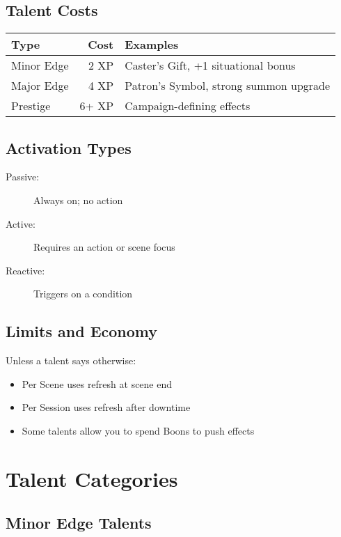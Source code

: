\documentclass[11pt,twoside,openany]{book}
\begin{document}
\subsection*{Talent Costs}

\begin{center}
\begin{tabular}{|l|r|l|}
\hline
\textbf{Type} & \textbf{Cost} & \textbf{Examples} \\
\hline
Minor Edge & 2 XP & Caster's Gift, +1 situational bonus \\
Major Edge & 4 XP & Patron's Symbol, strong summon upgrade \\
Prestige & 6+ XP & Campaign-defining effects \\
\hline
\end{tabular}
\end{center}

\subsection*{Activation Types}

\begin{description}
\item[Passive:] Always on; no action
\item[Active:] Requires an action or scene focus
\item[Reactive:] Triggers on a condition
\end{description}

\subsection*{Limits and Economy}

Unless a talent says otherwise:
\begin{itemize}
\item Per Scene uses refresh at scene end
\item Per Session uses refresh after downtime
\item Some talents allow you to spend Boons to push effects
\end{itemize}

\section*{Talent Categories} 

\subsection*{Minor Edge Talents}
\end{document}
